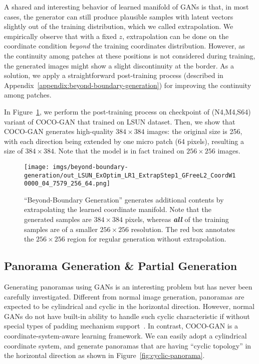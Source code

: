 \documentclass{article}
\newcommand{\modelName}{COCO-GAN }
\begin{document}
        A shared and interesting behavior of learned manifold of GANs is that, in most cases, the generator can still produce plausible samples with latent vectors slightly out of the training distribution, which we called extrapolation. 
We empirically observe that with a fixed $z$, extrapolation can be done on the coordinate condition \textit{beyond} the training coordinates distribution. However, as the continuity among patches at these positions is not considered during training, the generated images might show a slight discontinuity at the border. As a solution, we apply a straightforward post-training process (described in Appendix~\ref{appendix:beyond-boundary-generation}) for improving the continuity among patches.
        
        In Figure~\ref{fig:beyond-boundary-generation}, we perform the post-training process on checkpoint of (N4,M4,S64) variant of \modelName that trained on LSUN dataset. Then, we show that \modelName generates high-quality $384\times384$ images: the original size is 256, with each direction being extended by one micro patch (64 pixels), resulting a size of $384\times384$. Note that the model is in fact trained on $256\times256$ images. 
        


        \begin{figure}[t]
            \texttt{[image: imgs/beyond-boundary-generation/out\_LSUN\_ExOptim\_LR1\_ExtrapStep1\_GFreeL2\_CoordW10000\_04\_7579\_256\_64.png]}
            \caption{``Beyond-Boundary Generation'' generates additional contents by extrapolating the learned coordinate manifold. Note that the generated samples are $384\times384$ pixels, whereas \textbf{\textit{all}} of the training samples are of a smaller $256\times256$ resolution. The {\color{red} red} box annotates the $256\times256$ region for regular generation without extrapolation.} 
            \label{fig:beyond-boundary-generation}
            \vspace{-1em}
        \end{figure}
        
    \subsection{Panorama Generation \& Partial Generation}
    
        \label{exp:panorama-generation}
        
        Generating panoramas using GANs is an interesting problem but has never been carefully investigated. Different from normal image generation, panoramas are expected to be cylindrical and cyclic in the horizontal direction. However, normal GANs do not have built-in ability to handle such cyclic characteristic if without special types of padding mechanism support~\cite{cube-padding}. In contrast, \modelName is a coordinate-system-aware learning framework. We can easily adopt a cylindrical coordinate system, and generate panoramas that are having ``cyclic topology'' in the horizontal direction as shown in Figure~\ref{fig:cyclic-panorama}. 
\end{document}
